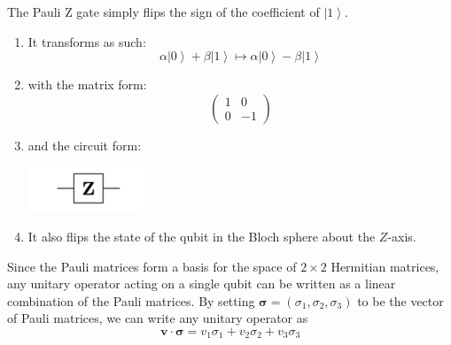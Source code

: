 \documentclass{article}
\newcommand{\ket}[1]{\ensuremath{\left|#1\right\rangle}}
\begin{document}
    \begin{definition}[Pauli Z]
      The Pauli Z gate simply flips the sign of the coefficient of $\ket{1}$. 
      \begin{enumerate} 
        \item It transforms as such: 
          \begin{equation} 
            \alpha \ket{0} + \beta \ket{1} \mapsto \alpha \ket{0} - \beta \ket{1}
          \end{equation}
        \item with the matrix form: 
          \begin{equation} 
            \begin{pmatrix} 1 & 0 \\ 0 & -1 \end{pmatrix}
          \end{equation}
        \item and the circuit form: 
          \begin{center}
            \includegraphics[scale=0.5]{img/Pauli_Z_gate.png}
          \end{center}
        \item It also flips the state of the qubit in the Bloch sphere about the $Z$-axis. 
      \end{enumerate}
    \end{definition}

    Since the Pauli matrices form a basis for the space of $2 \times 2$ Hermitian matrices, any unitary operator acting on a single qubit can be written as a linear combination of the Pauli matrices. By setting $\boldsymbol{\sigma} = (\sigma_1, \sigma_2, \sigma_3)$ to be the vector of Pauli matrices, we can write any unitary operator as 
    \begin{equation}
       \mathbf{v} \cdot \boldsymbol{\sigma} = v_1 \sigma_1 + v_2 \sigma_2 + v_3 \sigma_3
    \end{equation}
\end{document}
